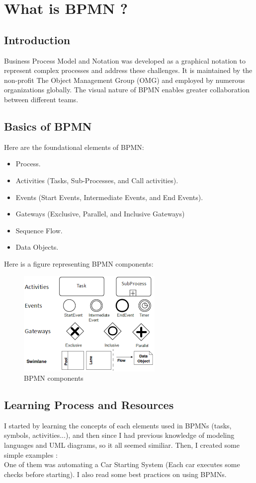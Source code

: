 \documentclass[12pt]{article}
\begin{document}
{\section{What is BPMN ?}

  \subsection{Introduction}

Business Process Model and Notation was developed as a graphical notation to represent complex processes and address these challenges. It is maintained by the non-profit The Object Management Group (OMG) and employed by numerous organizations globally. The visual nature of BPMN enables greater collaboration between different teams.

  \subsection{Basics of BPMN}

Here are the foundational elements of BPMN:

  \begin{itemize}
    \item Process.
    \item Activities (Tasks, Sub-Processes, and Call activities).
    \item Events (Start Events, Intermediate Events, and End Events).
    \item Gateways (Exclusive, Parallel, and Inclusive Gateways)
    \item Sequence Flow.
    \item Data Objects.
  \end{itemize}

\pagebreak

Here is a figure representing BPMN components:

\begin{figure}[h]
    \centering
    \includegraphics[width=.35\linewidth]{bpmn.png}
    \caption{BPMN components}
    \label{fig:bpmn}
\end{figure}

  \subsection{Learning Process and Resources}
I started by learning the concepts of each elements used in BPMNs (tasks, symbols, activities...), and then since I had previous knowledge of modeling languages and UML diagrams, so it all seemed similiar.
Then, I created some simple examples :
\\
One of them was automating a Car Starting System (Each car executes some checks before starting).
I also read some best practices on using BPMNs.

}
\end{document}
